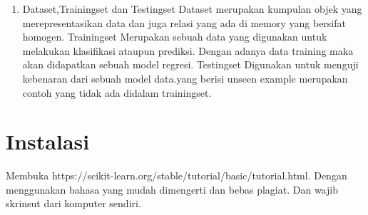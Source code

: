 \begin{enumerate}
\item
Dataset,Trainingset dan Testingset 
Dataset merupakan kumpulan objek yang merepresentasikan data dan juga relasi yang ada di memory yang bersifat homogen.
Trainingset Merupakan sebuah data yang digunakan untuk melakukan klasifikasi ataupun prediksi. Dengan adanya data training maka akan didapatkan sebuah model regresi.
Testingset Digunakan untuk menguji kebenaran dari sebuah model data.yang berisi unseen example merupakan contoh yang tidak ada didalam trainingset.
\end{enumerate}

\section{Instalasi}
Membuka https://scikit-learn.org/stable/tutorial/basic/tutorial.html. Dengan menggunakan bahasa yang mudah dimengerti dan bebas plagiat. 
Dan wajib skrinsut dari komputer sendiri.
